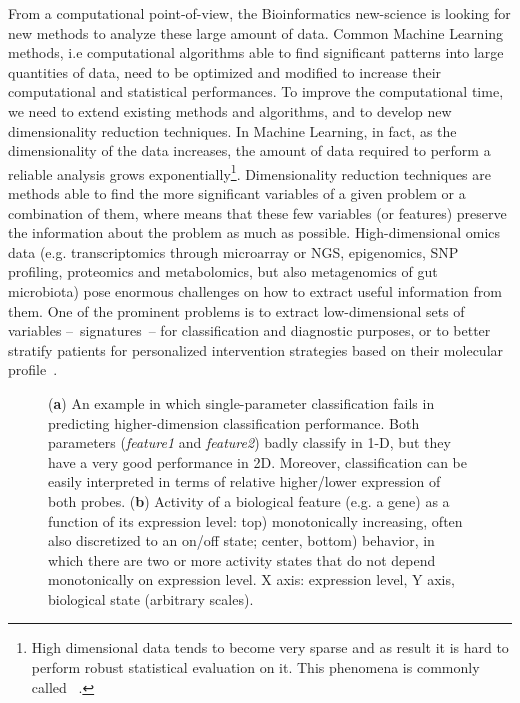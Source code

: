 \documentclass{standalone}
\begin{document}
From a computational point-of-view, the Bioinformatics new-science is looking for new methods to analyze these large amount of data.
Common Machine Learning methods, i.e computational algorithms able to find significant patterns into large quantities of data, need to be optimized and modified to increase their computational and statistical performances.
To improve the computational time, we need to extend existing methods and algorithms, and to develop new dimensionality reduction techniques.
In Machine Learning, in fact, as the dimensionality of the data increases, the amount of data required to perform a reliable analysis grows exponentially\footnote{
  High dimensional data tends to become very sparse and as result it is hard to perform robust statistical evaluation on it.
  This phenomena is commonly called ~\cite{bellman1961adaptive}.
}.
Dimensionality reduction techniques are methods able to find the more significant variables of a given problem or a combination of them, where  means that these few variables (or features) preserve the information about the problem as much as possible.
High-dimensional omics data (e.g. transcriptomics through microarray or NGS, epigenomics, SNP profiling, proteomics and metabolomics, but also metagenomics of gut microbiota) pose enormous challenges on how to extract useful information from them.
One of the prominent problems is to extract low-dimensional sets of variables –~signatures~– for classification and diagnostic purposes, or to better stratify patients for personalized intervention strategies based on their molecular profile~\cite{Scotlandi2009, Chan2011, Johnson2017, Beckmann2016ReconcilingEM}.


\begin{figure}[htbp]
\centering
\def\svgwidth{0.4\textwidth}

\qquad\qquad
\def\svgwidth{0.4\textwidth}

\caption{(\textbf{a}) An example in which single-parameter classification fails in predicting higher-dimension classification performance.
Both parameters (\emph{feature1} and \emph{feature2}) badly classify in 1-D, but they have a very good performance in 2D.
Moreover, classification can be easily interpreted in terms of relative higher/lower expression of both probes.
(\textbf{b}) Activity of a biological feature (e.g. a gene) as a function of its expression level:
top) monotonically increasing, often also discretized to an on/off state;
center, bottom)  behavior, in which there are two or more activity states that do not depend monotonically on expression level.
X axis: expression level, Y axis, biological state (arbitrary scales).
}
\label{fig:example}
\end{figure}
\end{document}
